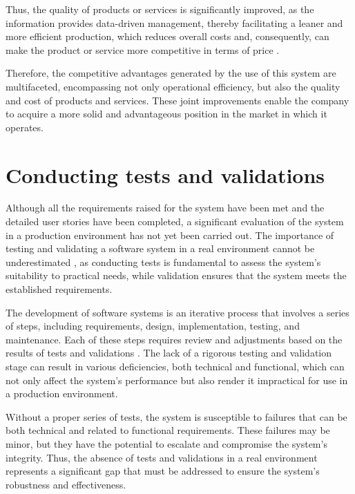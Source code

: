 Thus, the quality of products or services is significantly improved, as the information provides data-driven management, thereby facilitating a leaner and more efficient production, which reduces overall costs and, consequently, can make the product or service more competitive in terms of price \cite{glowalla2014processDriven}.

Therefore, the competitive advantages generated by the use of this system are multifaceted, encompassing not only operational efficiency, but also the quality and cost of products and services. These joint improvements enable the company to acquire a more solid and advantageous position in the market in which it operates.

\section{Conducting tests and validations}\label{sec:tests}
Although all the requirements raised for the system have been met and the detailed user stories have been completed, a significant evaluation of the system in a production environment has not yet been carried out. The importance of testing and validating a software system in a real environment cannot be underestimated \cite{leTraon1999selfTestable}, as conducting tests is fundamental to assess the system's suitability to practical needs, while validation ensures that the system meets the established requirements.

The development of software systems is an iterative process that involves a series of steps, including requirements, design, implementation, testing, and maintenance. Each of these steps requires review and adjustments based on the results of tests and validations \cite{coleman2006softwareProcess}. The lack of a rigorous testing and validation stage can result in various deficiencies, both technical and functional, which can not only affect the system's performance but also render it impractical for use in a production environment.

Without a proper series of tests, the system is susceptible to failures that can be both technical and related to functional requirements. These failures may be minor, but they have the potential to escalate and compromise the system's integrity. Thus, the absence of tests and validations in a real environment represents a significant gap that must be addressed to ensure the system's robustness and effectiveness.